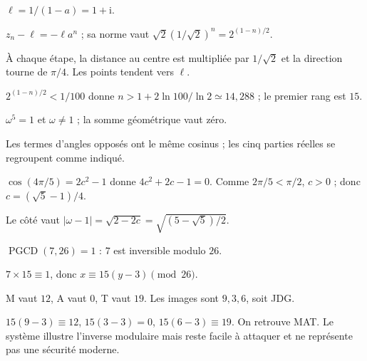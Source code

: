 \par\addvspace{6mm}\label{projet-cor-1}
\begin{questions}
\item $\ell=1/(1-a)=1+\mathrm i$.
\item $z_n-\ell=-\ell a^n$ ; sa norme vaut $\sqrt2(1/\sqrt2)^n=2^{(1-n)/2}$.
\item À chaque étape, la distance au centre est multipliée par $1/\sqrt2$ et la direction tourne de $\pi/4$. Les points tendent vers $\ell$.
\item $2^{(1-n)/2}<1/100$ donne $n>1+2\ln100/\ln2\simeq14{,}288$ ; le premier rang est $15$.
\end{questions}
\par\addvspace{6mm}\label{projet-cor-2}
\begin{questions}
\item $\omega^5=1$ et $\omega\ne1$ ; la somme géométrique vaut zéro.
\item Les termes d’angles opposés ont le même cosinus ; les cinq parties réelles se regroupent comme indiqué.
\item $\cos(4\pi/5)=2c^2-1$ donne $4c^2+2c-1=0$. Comme $2\pi/5<\pi/2$, $c>0$ ; donc $c=(\sqrt5-1)/4$.
\item Le côté vaut $|\omega-1|=\sqrt{2-2c}=\sqrt{(5-\sqrt5)/2}$.
\end{questions}
\par\addvspace{6mm}\label{projet-cor-3}
\begin{questions}
\item $\operatorname{PGCD}(7,26)=1$ : $7$ est inversible modulo $26$.
\item $7\times15\equiv1$, donc $x\equiv15(y-3)\pmod{26}$.
\item M vaut $12$, A vaut $0$, T vaut $19$. Les images sont $9,3,6$, soit JDG.
\item $15(9-3)\equiv12$, $15(3-3)=0$, $15(6-3)\equiv19$. On retrouve MAT. Le système illustre l’inverse modulaire mais reste facile à attaquer et ne représente pas une sécurité moderne.
\end{questions}
